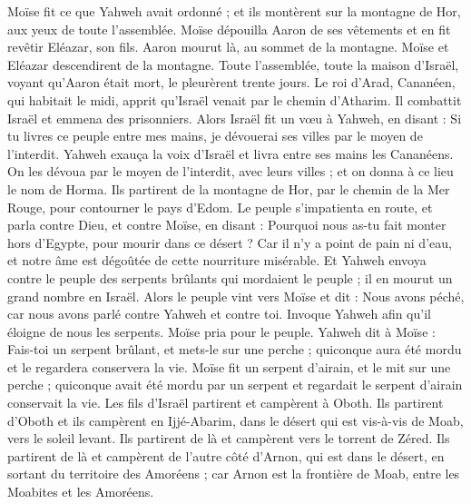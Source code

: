 \begin{multicols}{2}
Moïse fit ce que Yahweh avait ordonné ; et ils montèrent sur la montagne de Hor, aux yeux de toute l'assemblée.
Moïse dépouilla Aaron de ses vêtements et en fit revêtir Eléazar, son fils. Aaron mourut là, au sommet de la montagne. Moïse et Eléazar descendirent de la montagne.
Toute l'assemblée, toute la maison d'Israël, voyant qu'Aaron était mort, le pleurèrent trente jours.
\VerseOne{}Le roi d’Arad, Cananéen, qui habitait le midi, apprit qu'Israël venait par le chemin d’Atharim. Il combattit Israël et emmena des prisonniers.
Alors Israël fit un vœu à Yahweh, en disant : Si tu livres ce peuple entre mes mains, je dévouerai ses villes par le moyen de l'interdit.
Yahweh exauça la voix d'Israël et livra entre ses mains les Cananéens. On les dévoua par le moyen de l’interdit, avec leurs villes ; et on donna à ce lieu le nom de Horma.
Ils partirent de la montagne de Hor, par le chemin de la Mer Rouge, pour contourner le pays d'Edom. Le peuple s’impatienta en route,
et parla contre Dieu, et contre Moïse, en disant : Pourquoi nous as-tu fait monter hors d'Egypte, pour mourir dans ce désert ? Car il n’y a point de pain ni d'eau, et notre âme est dégoûtée de cette nourriture misérable.
Et Yahweh envoya contre le peuple des serpents brûlants qui mordaient le peuple ; il en mourut un grand nombre en Israël.
Alors le peuple vint vers Moïse et dit : Nous avons péché, car nous avons parlé contre Yahweh et contre toi. Invoque Yahweh afin qu'il éloigne de nous les serpents. Moïse pria pour le peuple.
Yahweh dit à Moïse : Fais-toi un serpent brûlant, et mets-le sur une perche ; quiconque aura été mordu et le regardera conservera la vie.
Moïse fit un serpent d'airain, et le mit sur une perche ; quiconque avait été mordu par un serpent et regardait le serpent d'airain conservait la vie.
Les fils d'Israël partirent et campèrent à Oboth.
Ils partirent d'Oboth et ils campèrent en Ijjé-Abarim, dans le désert qui est vis-à-vis de Moab, vers le soleil levant.
Ils partirent de là et campèrent vers le torrent de Zéred.
Ils partirent de là et campèrent de l’autre côté d'Arnon, qui est dans le désert, en sortant du territoire des Amoréens ; car Arnon est la frontière de Moab, entre les Moabites et les Amoréens.

\end{multicols}
